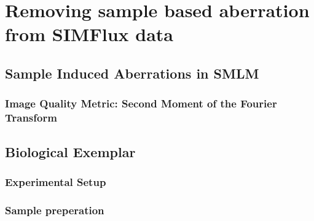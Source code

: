 \chapter{Removing sample based aberration from SIMFlux data}

\section{Sample Induced Aberrations in SMLM}
\label{sec:sample_aberrations_SMLM}

\subsection{Image Quality Metric: Second Moment of the Fourier Transform}
\label{sec:second_moment_metric}

\section{Biological Exemplar}
\label{sec:SIMFlux_biology}

\subsection{Experimental Setup}
\label{subsec:SIMFlux_setup}

\subsection{Sample preperation}
\label{subsec:SIMFlux_sample_prep}
